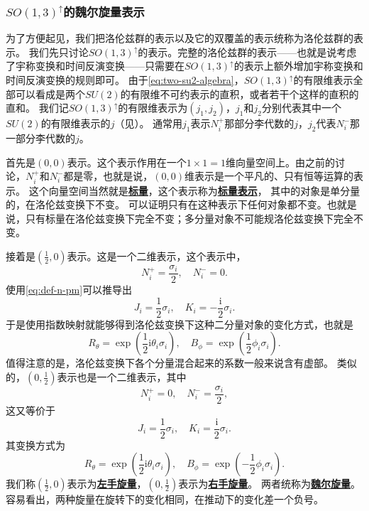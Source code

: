 \documentclass[hyperref, UTF8, a4paper]{ctexart}
\newcommand*{\ii}{\mathrm{i}}
\renewcommand{\autoref}{\prettyref}
\newcommand{\concept}[1]{\underline{\textbf{#1}}}
\begin{document}
\subsubsection{$SO(1,3)^\uparrow$的魏尔旋量表示}\label{sec:weyl-spinor-representation}

为了方便起见，我们把洛伦兹群的表示以及它的双覆盖的表示统称为洛伦兹群的表示。
我们先只讨论$SO(1,3)^\uparrow$的表示。完整的洛伦兹群的表示——也就是说考虑了宇称变换和时间反演变换——只需要在$SO(1,3)^\uparrow$的表示上额外增加宇称变换和时间反演变换的规则即可。
由于\eqref{eq:two-su2-algebra}，$SO(1,3)^\uparrow$的有限维表示全部可以看成是两个$SU(2)$的有限维不可约表示的直积，或者若干个这样的直积的直和。
我们记$SO(1,3)^\uparrow$的有限维表示为$(j_1, j_2)$，$j_1$和$j_2$分别代表其中一个$SU(2)$的有限维表示的$j$（见\autoref{sec:rotation}）。
通常用$j_1$表示$N^+_i$那部分李代数的$j$，$j_2$代表$N^-_i$那一部分李代数的$j$。

首先是$(0,0)$表示。这个表示作用在一个$1\times1 = 1$维向量空间上。由之前的讨论，$N^+_i$和$N^-_i$都是零，也就是说，$(0,0)$维表示是一个平凡的、只有恒等运算的表示。
这个向量空间当然就是\concept{标量}，这个表示称为\concept{标量表示}，
其中的对象是单分量的，在洛伦兹变换下不变。
可以证明只有在这种表示下任何对象都不变。也就是说，只有标量在洛伦兹变换下完全不变；多分量对象不可能规洛伦兹变换下完全不变。

接着是$(\frac{1}{2}, 0)$表示。这是一个二维表示，这个表示中，
\begin{equation}
    N^+_i = \frac{\sigma_i}{2}, \quad N^-_i = 0.
\end{equation}
使用\eqref{eq:def-n-pm}可以推导出
\begin{equation}
    J_i = \frac{1}{2} \sigma_i, \quad K_i = - \frac{\ii}{2} \sigma_i.
\end{equation}
于是使用指数映射就能够得到洛伦兹变换下这种二分量对象的变化方式，也就是
\begin{equation}
    R_\theta = \exp \left( \frac{1}{2} \ii \theta_i \sigma_i \right), \quad B_\phi = \exp \left( \frac{1}{2} \phi_i \sigma_i \right).
\end{equation}
值得注意的是，洛伦兹变换下各个分量混合起来的系数一般来说含有虚部。
类似的，$(0, \frac{1}{2})$表示也是一个二维表示，其中
\begin{equation}
    N^+_i = 0, \quad N^-_i = \frac{\sigma_i}{2},
\end{equation}
这又等价于
\begin{equation}
    J_i = \frac{1}{2} \sigma_i, \quad K_i = \frac{\ii}{2} \sigma_i.
\end{equation}
其变换方式为
\begin{equation}
    R_\theta = \exp \left( \frac{1}{2} \ii \theta_i \sigma_i \right), \quad B_\phi = \exp \left( - \frac{1}{2} \phi_i \sigma_i \right).
\end{equation}
我们称$(\frac{1}{2}, 0)$表示为\concept{左手旋量}，$(0, \frac{1}{2})$表示为\concept{右手旋量}。
两者统称为\concept{魏尔旋量}。容易看出，两种旋量在旋转下的变化相同，在推动下的变化差一个负号。
\end{document}
